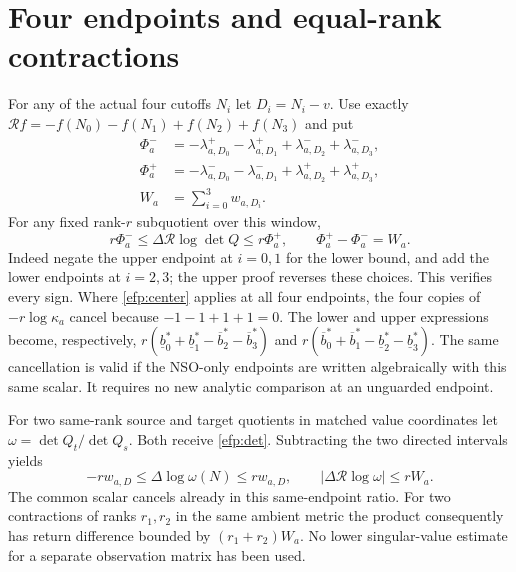\documentclass[11pt,a4paper]{article}
\begin{document}
\section{Four endpoints and equal-rank contractions}
For any of the actual four cutoffs $N_i$ let $D_i=N_i-v$.
Use exactly
$\mathcal Rf=-f(N_0)-f(N_1)+f(N_2)+f(N_3)$ and put
\[
\begin{aligned}
\Phi_a^-&=-\lambda^+_{a,D_0}-\lambda^+_{a,D_1}
                      +\lambda^-_{a,D_2}+\lambda^-_{a,D_3},\\
\Phi_a^+&=-\lambda^-_{a,D_0}-\lambda^-_{a,D_1}
                      +\lambda^+_{a,D_2}+\lambda^+_{a,D_3},\\
W_a&=\sum_{i=0}^3w_{a,D_i}.
\end{aligned}\tag{EFP15}\label{efp:returnconstants}
\]
For any fixed rank-$r$ subquotient over this window,
\[
r\Phi_a^-\le
 \Delta\mathcal R\log\det Q\le r\Phi_a^+,\qquad
\Phi_a^+-\Phi_a^-=W_a.
\tag{EFP16}\label{efp:return}
\]
Indeed negate the upper endpoint at $i=0,1$ for the lower bound,
and add the lower endpoints at $i=2,3$; the upper proof reverses these
choices. This verifies every sign. Where \eqref{efp:center} applies
at all four endpoints, the four copies of $-r\log\kappa_a$ cancel
because $-1-1+1+1=0$. The lower and upper expressions become,
respectively,
$r(\underline b^*_0+\underline b^*_1-\overline b^*_2-\overline b^*_3)$
and
$r(\overline b^*_0+\overline b^*_1-\underline b^*_2-\underline b^*_3)$.
The same cancellation is valid if the NSO-only endpoints are
written algebraically with this same scalar. It requires no new
analytic comparison at an unguarded endpoint.

For two same-rank source and target quotients in matched value
coordinates let $\omega=\det Q_t/\det Q_s$. Both receive
\eqref{efp:det}. Subtracting the two directed intervals yields
\[
-rw_{a,D}\le\Delta\log\omega(N)\le rw_{a,D},\qquad
|\Delta\mathcal R\log\omega|\le rW_a .
\tag{EFP17}\label{efp:contraction}
\]
The common scalar cancels already in this same-endpoint ratio.
For two contractions of ranks $r_1,r_2$ in the same ambient metric
the product consequently has return difference bounded by
$(r_1+r_2)W_a$. No lower singular-value estimate for a separate
observation matrix has been used.
\end{document}
